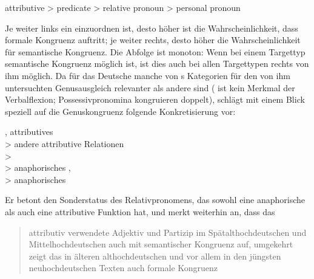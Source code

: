 \begin{exe}
\ex attributive > predicate > relative pronoun > personal pronoun
\end{exe}

Je weiter links ein  einzuordnen ist, desto höher ist die
Wahrscheinlichkeit, dass formale Kongruenz auftritt; je
weiter rechts, desto höher die Wahrscheinlichkeit für semantische
Kongruenz. Die Abfolge ist monoton: Wenn
bei einem Targettyp semantische Kongruenz möglich ist, ist dies auch bei allen
Targettypen rechts von ihm möglich. Da für das Deutsche
manche von \citeauthor{corbett1979}s Kategorien für den von ihm untersuchten
Genusausgleich relevanter als andere sind ( ist kein Merkmal der
Verbalflexion; Possessivpronomina kongruieren doppelt),
schlägt \citet[193]{fleischer2012} mit einem Blick speziell auf die
Genuskongruenz folgende Konkretisierung vor:

\begin{exe}
\ex {}, attributives  \\
	\hspace*{1em} > andere attributive Relationen \\
	\hspace*{2em} >  \\
	\hspace*{3em} > anaphorisches ,
		 \\
	\hspace*{4em} > anaphorisches 
\end{exe}

Er betont den Sonderstatus des Relativpronomens, das sowohl
eine anaphorische als auch eine attributive Funktion
hat, und merkt weiterhin an, dass das
\blockcquote[194]{fleischer2012}{attributiv verwendete
Adjektiv und Partizip \textelp{} im
Spätalthochdeutschen und
Mittelhochdeutschen auch mit semantischer
Kongruenz auf, umgekehrt zeigt das
 in älteren althochdeutschen und vor
allem in den jüngsten neuhochdeutschen Texten auch formale
Kongruenz}.

